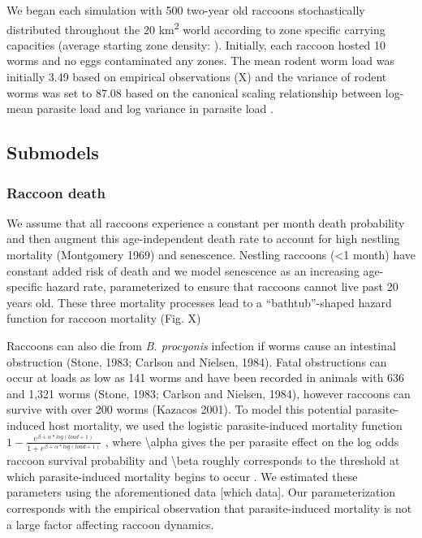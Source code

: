 \documentclass[11pt]{article}
\begin{document}
We began each simulation with 500 two-year old raccoons stochastically
distributed throughout the 20 km\textsuperscript{2} world according to
zone specific carrying capacities (average starting zone density: ).
Initially, each raccoon hosted 10 worms and no eggs contaminated any
zones. The mean rodent worm load was initially 3.49 based on
empirical observations (X) and the variance of rodent worms
was set to 87.08 based on the canonical scaling relationship between
log-mean parasite load and log variance in parasite load \citep{Shaw1995}.

\subsection{Submodels}

\subsubsection{Raccoon death}

We assume that all raccoons experience a constant per month death
probability and then augment this age-independent death rate to account
for high nestling mortality (Montgomery 1969) and senescence. Nestling
raccoons (\textless{}1 month) have constant added risk of death and we
model senescence as an increasing age-specific hazard rate,
parameterized to ensure that raccoons cannot live past 20 years old.
These three mortality processes lead to a ``bathtub''-shaped hazard
function for raccoon mortality (Fig. X)

Raccoons can also die from \emph{B. procyonis} infection if worms cause
an intestinal obstruction (Stone, 1983; Carlson and Nielsen, 1984).
Fatal obstructions can occur at loads as low as 141 worms and have been
recorded in animals with 636 and 1,321 worms (Stone, 1983; Carlson and
Nielsen, 1984), however raccoons can survive with over 200 worms
(Kazacos 2001). To model this potential parasite-induced host mortality,
we used the logistic parasite-induced mortality function
\(1 - \frac{e^{\beta + \alpha*log(load + 1)}}{1 + e^{\beta + \alpha*log(load + 1)}}\)
, where \textbackslash{}alpha gives the per parasite effect on the log
odds raccoon survival probability and \textbackslash{}beta roughly
corresponds to the threshold at which parasite-induced mortality begins
to occur \citep{Wilber2016}. We estimated these parameters using the aforementioned data [which data]. Our parameterization corresponds with the empirical observation that parasite-induced mortality is not a large factor affecting raccoon dynamics.
\end{document}
